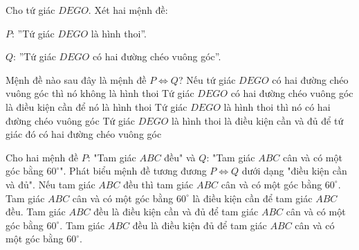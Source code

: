 \begin{ex}
	Cho tứ giác ${DEGO}$. Xét hai mệnh đề:
	
	$P$: ''Tứ giác ${DEGO}$ là hình thoi''.
	
	$Q$: ''Tứ giác ${DEGO}$ có hai đường chéo vuông góc''.
	
	Mệnh đề nào sau đây là mệnh đề $P\Leftrightarrow Q$?
	\choice
		{ Nếu tứ giác ${DEGO}$ có hai đường chéo vuông góc thì nó không là hình thoi }
		{ Tứ giác ${DEGO}$ có hai đường chéo vuông góc là điều kiện cần để nó là hình thoi }
		{ Tứ giác ${DEGO}$ là hình thoi thì nó có hai đường chéo vuông góc }
		{ \True Tứ giác ${DEGO}$ là hình thoi là điều kiện cần và đủ để tứ giác đó có hai đường chéo vuông góc }
\end{ex}
\begin{ex}
	Cho hai mệnh đề $P$: "Tam giác $ABC$ đều" và $Q$: "Tam giác $ABC$ cân và có một góc bằng $60^\circ$". Phát biểu mệnh đề tương đương $P \Leftrightarrow Q$ dưới dạng "điều kiện cần và đủ".
	\choice
	{Nếu tam giác $ABC$ đều thì tam giác $ABC$ cân và có một góc bằng $60^\circ$.}
	{Tam giác $ABC$ cân và có một góc bằng $60^\circ$ là điều kiện cần để tam giác $ABC$ đều.}
	{\True Tam giác $ABC$ đều là điều kiện cần và đủ để tam giác $ABC$ cân và có một góc bằng $60^\circ$.}
	{Tam giác $ABC$ đều là điều kiện đủ để tam giác $ABC$ cân và có một góc bằng $60^\circ$.}
\end{ex}

